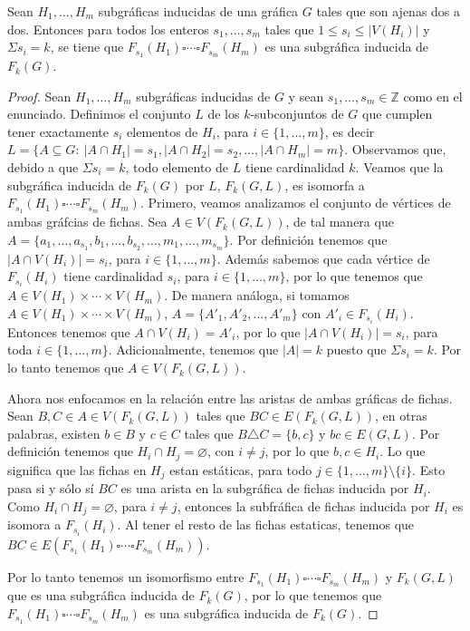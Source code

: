 \begin{teorema}
    \label{teo:PCartes}
    Sean $H_1, \dots, H_m$ subgr\'aficas inducidas de una gr\'afica
    $G$ tales que son ajenas dos a dos. Entonces para todos los enteros
    $s_1, \dots, s_m$ tales que $1 \leq s_i \leq |V(H_i)|$ y
    $\Sigma s_i = k$, se tiene que $F_{s_1}(H_1) \square \cdots
    \square F_{s_m}(H_m)$ es una subgr\'afica inducida de $F_k(G)$.
\end{teorema}

\begin{proof}
    Sean $H_1, \dots, H_m$ subgr\'aficas inducidas de  $G$ y sean $s_1,
    \dots, s_m \in \mathbb{Z}$ como en el enunciado. Definimos el
    conjunto $L$ de los $k$-subconjuntos de $G$ que cumplen tener
    exactamente $s_i$ elementos de $H_i$, para $i \in \{1, \dots, m\}$,
    es decir $L = \{A \subseteq G \colon\ |A\cap H_1|=s_1 , |A \cap
    H_2|=s_2, \dots, |A \cap H_m|=m \}$. Observamos que, debido a  que
    $\Sigma s_i = k$, todo elemento de $L$ tiene cardinalidad $k$.
    Veamos que la subgr\'afica inducida de $F_k(G)$ por $L$, $F_k(G,L)$,
    es isomorfa a $F_{s_1}(H_1) \square \cdots \square F_{s_m}(H_m)$.
    Primero, veamos analizamos el conjunto de v\'ertices de ambas
    gr\'afcias de fichas. Sea $A \in V(F_k(G,L))$, de tal manera que $A=\{a_1,
    \dots, a_{s_1}, b_1,\dots, b_{s_2}, \dots, m_1, \dots, m_{s_m}\}$.
    Por definici\'on tenemos que $|A \cap V(H_i)|= s_i$, para $i \in
    \{1, \dots, m\}$. Adem\'as sabemos que cada v\'ertice de
    $F_{s_i}(H_i)$ tiene cardinalidad $s_i$, para $i \in \{1, \dots,
    m\}$, por lo que tenemos que $A \in V(H_1) \times \cdots \times
    V(H_m)$. De manera an\'aloga, si tomamos $A \in V(H_1) \times \cdots
    \times V(H_m)$, $A = \{A'_1, A'_2, \dots, A'_m\}$ con $A'_i \in
    F_{s_i}(H_i)$. Entonces tenemos que $A \cap V(H_i) = A'_i$, por lo
    que $|A \cap V(H_i)|= s_i$, para toda $i \in \{1, \dots, m\}$.
    Adicionalmente, tenemos que $|A|= k$ puesto que $\Sigma s_i = k$.
    Por lo tanto tenemos que $A \in V(F_k(G,L))$.

    Ahora nos enfocamos en la relaci\'on entre las aristas de ambas
    gr\'aficas de fichas. Sean $B, C \in A \in V(F_k(G,L))$ tales que
    $BC \in E(F_k(G,L))$, en otras palabras, existen $b \in B$ y $c \in
    C$ tales que $B \triangle C = \{b, c\}$ y $bc \in E(G,L)$. Por
    definici\'on tenemos que $H_i \cap H_j = \varnothing$, con $i \neq
    j$, por lo que $b, c \in H_i$. Lo que significa que las fichas en
    $H_j$ estan est\'aticas, para todo $j \in \{1, \dots, m\} \setminus
    \{i\}$. Esto pasa si y s\'olo s\'i $BC$ es una arista en la
    subgr\'afica de fichas inducida por $H_i$. Como $H_i \cap H_j =
    \varnothing$, para $i \neq j$, entonces la subfr\'afica de fichas
    inducida por $H_i$ es isomora a $F_{s_i}(H_i)$. Al tener el resto de
    las fichas estaticas, tenemos que $BC \in E(F_{s_1}(H_1) \square
    \cdots \square F_{s_m}(H_m))$.

    Por lo tanto tenemos un isomorfismo entre $F_{s_1}(H_1) \square
    \cdots \square F_{s_m}(H_m)$ y $F_k(G,L)$ que es una subgr\'afica
    inducida de $F_k(G)$, por lo que tenemos que $F_{s_1}(H_1) \square
    \cdots \square F_{s_m}(H_m)$ es una subgr\'afica inducida de
    $F_k(G)$.
\end{proof}
